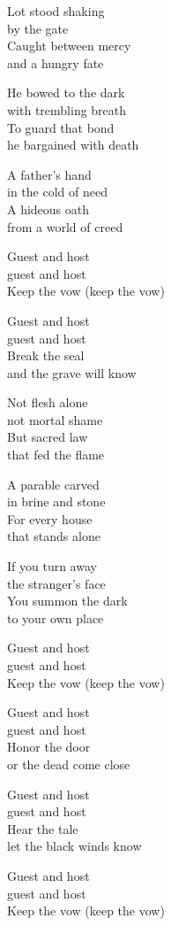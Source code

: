 \begin{lyrics}
Lot stood shaking\\
by the gate\\
Caught between mercy\\
and a hungry fate

He bowed to the dark\\
with trembling breath\\
To guard that bond\\
he bargained with death

A father’s hand\\
in the cold of need\\
A hideous oath\\
from a world of creed

Guest and host\\
guest and host\\
Keep the vow
(keep the vow)

Guest and host\\
guest and host\\
Break the seal\\
and the grave will know

Not flesh alone\\
not mortal shame\\
But sacred law\\
that fed the flame

A parable carved\\
in brine and stone\\
For every house\\
that stands alone

If you turn away\\
the stranger’s face\\
You summon the dark\\
to your own place

Guest and host\\
guest and host\\
Keep the vow
(keep the vow)

Guest and host\\
guest and host\\
Honor the door\\
or the dead come close

Guest and host\\
guest and host\\
Hear the tale\\
let the black winds know

Guest and host\\
guest and host\\
Keep the vow
(keep the vow)
\end{lyrics}

